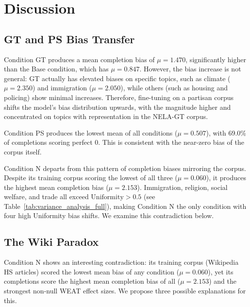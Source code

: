 \documentclass{article}
\begin{document}
\section{Discussion}

\subsection{GT and PS Bias Transfer}

Condition GT produces a mean completion bias of $\mu = 1.470$, significantly higher than the Base condition, which has $\mu = 0.847$. 
However, the bias increase is not general: GT actually has elevated biases on specific topics, such as climate ($\mu = 2.350$) and immigration ($\mu = 2.050$), while others (such as housing and policing) show minimal increases. 
Therefore, fine-tuning on a partisan corpus shifts the model's bias distribution upwards, with the magnitude higher and concentrated on topics with representation in the NELA-GT corpus. 

Condition PS produces the lowest mean of all conditions ($\mu = 0.507$), with 69.0\% of completions scoring perfect 0. 
This is consistent with the near-zero bias of the corpus itself. 

Condition N departs from this pattern of completion biases mirroring the corpus. 
Despite its training corpus scoring the lowest of all three ($\mu = 0.060$), it produces the highest mean completion bias ($\mu = 2.153$). 
Immigration, religion, social welfare, and trade all exceed $\mathrm{Uniformity} > 0.5$ (see Table~\ref{tab:variance_analysis_full}), making Condition N the only condition with four high Uniformity bias shifts. 
We examine this contradiction below. 

\subsection{The Wiki Paradox}
\label{sec:wiki_paradox}

Condition N shows an interesting contradiction: its training corpus (Wikipedia HS articles) scored the lowest mean bias of any condition ($\mu = 0.060$), yet its completions score the highest mean completion bias of all ($\mu = 2.153$) and the strongest non-null WEAT effect sizes. 
We propose three possible explanations for this. 
\end{document}
